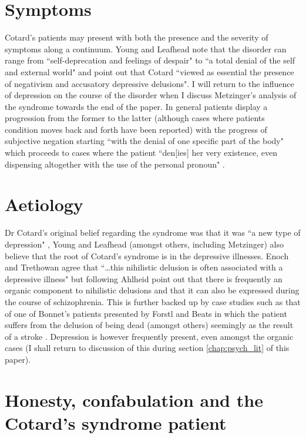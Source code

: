 \section{Symptoms}

Cotard's patients may present with both the presence and the severity of symptoms along a continuum. Young and Leafhead \cite{young1995} note that the disorder can range from ``self-deprecation and feelings of despair" to ``a total denial of the self and external world" and point out that Cotard ``viewed as essential the presence of negativism and accusatory depressive delusions". I will return to the influence of depression on the course of the disorder when I discuss Metzinger's analysis of the syndrome towards the end of the paper. In general patients display a progression from the former to the latter (although cases where patients condition moves back and forth have been reported) with the progress of subjective negation starting ``with the denial of one specific part of the body" which proceeds to cases where the patient ``den[ies] her very existence, even dispensing altogether with the use of the personal pronoun" \cite{young1995}.

\section{Aetiology}

Dr Cotard's original belief regarding the syndrome was that it was ``a new type of depression" \cite[p. 185]{berrios1995b}, Young and Leafhead (amongst others, including Metzinger) also believe that the root of Cotard's syndrome is in the depressive illnesses. Enoch and Trethowan\cite[p. 173]{enoch1991} agree that ``\ldots this nihilistic delusion is often associated with a depressive illness" but following Ahlheid \cite{ahlheid1968} point out that there is frequently an organic component to nihilistic delusions and that it can also be expressed during the course of schizophrenia. This is further backed up by case studies such as that of one of Bonnet's patients presented by Forstl and Beats in which the patient suffers from the delusion of being dead (amongst others) seemingly as the result of a stroke \cite{forstl1992}.  Depression is however frequently present, even amongst the organic cases (I shall return to discussion of this during section \ref{chap:psych_lit} of this paper).

\section{Honesty, confabulation and the Cotard's syndrome patient}

